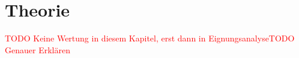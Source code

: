 \noindent
\section{Theorie}


\textcolor{red}{TODO Keine Wertung in diesem Kapitel, erst dann in Eignungsanalyse\break TODO Genauer Erklären}




